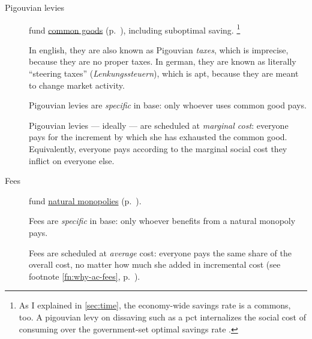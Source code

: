 \begin{description}
	\item[Pigouvian levies]
	\label{sec:levies}
	fund \hyperref[sec:common-good]{common goods} (p.~\pageref{sec:common-good}), including suboptimal saving.
	\footnote{
		As I explained in \autoref{sec:time}, the economy-wide savings rate is a commons, too.
		A pigouvian levy on dissaving such as a \gls{pct} internalizes the social cost of consuming over the government-set optimal savings rate \citep{Held2010a}.
	}

	In english, they are also known as Pigouvian \emph{taxes}, which is imprecise, because they are no proper taxes.
	In german, they are known as literally ``steering taxes'' (\emph{Lenkungssteuern}), which is apt, because they are meant to change market activity.

	Pigouvian levies are \emph{specific} in base:
	only whoever uses common good pays.

	Pigouvian levies --- ideally --- are scheduled at \emph{marginal cost}:
	everyone pays for the increment by which she has exhausted the common good.
	Equivalently, everyone pays according to the marginal social cost they inflict on everyone else.




	\item[Fees]
		\label{sec:fees}
	fund \hyperref[sec:natural-monopoly]{natural monopolies} (p.~\pageref{sec:natural-monopoly}).

	Fees are \emph{specific} in base:
	only whoever benefits from a natural monopoly pays.

	Fees are scheduled at \emph{average} cost:
	everyone pays the same share of the overall cost, no matter how much she added in incremental cost (see footnote \ref{fn:why-ac-fees}, p.~\pageref{fn:why-ac-fees}).


\end{description}
